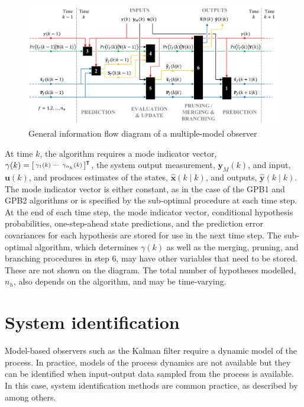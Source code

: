 {\begin{figure}[ht]
	\centering
	\includegraphics[width=15.5cm]{images/mkf_infoflow.pdf}
	\caption{General information flow diagram of a multiple-model observer}
	\label{fig:mkf-infoflow}
\end{figure}

At time $k$, the algorithm requires a mode indicator vector, $\gamma(k)=\begin{bsmallmatrix} \gamma_1(k) & \cdots & \gamma_{n_h}(k) \end{bsmallmatrix}^\intercal$, the system output measurement, $\mathbf{y}_M(k)$, and input, $\mathbf{u}(k)$, and produces estimates of the states, $\hat{\mathbf{x}}(k \mid k)$, and outputs, $\hat{\mathbf{y}}(k \mid k)$. The mode indicator vector is either constant, as in the case of the \gls{GPB1} and \gls{GPB2} algorithms or is specified by the sub-optimal procedure at each time step. At the end of each time step, the mode indicator vector, conditional hypothesis probabilities, one-step-ahead state predictions, and the prediction error covariances for each hypothesis are stored for use in the next time step. The sub-optimal algorithm, which determines $\gamma(k)$ as well as the merging, pruning, and branching procedures in step 6, may have other variables that need to be stored. These are not shown on the diagram. The total number of hypotheses modelled, $n_h$, also depends on the algorithm, and may be time-varying.

\section{System identification} \label{sec:sys-id}

Model-based observers such as the Kalman filter require a dynamic model of the process. In practice, models of the process dynamics are not available but they can be identified when input-output data sampled from the process is available. In this case, system identification methods are common practice, as described by \cite{ljung_system_1999} among others.

}
